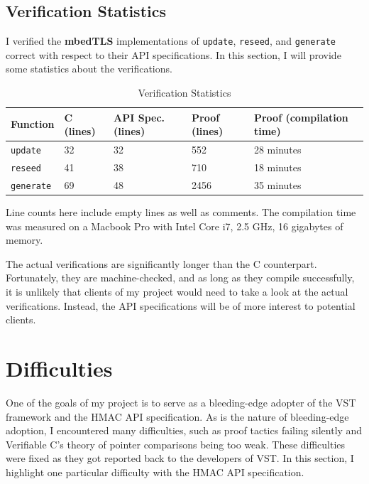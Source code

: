 \documentclass[pageno]{jpaper}
\newcommand{\stdtitle}[1]{\textbf{#1}}
\begin{document}
\subsection{Verification Statistics}

I verified the \stdtitle{mbedTLS} implementations of \lstinline{update}, \lstinline{reseed}, and \lstinline{generate} correct with respect to their API specifications. In this section, I will provide some statistics about the verifications.

\begin{table}[h!]
  \centering
  \begin{tabular}{|l|l|l|l|l|}
    \hline
    \textbf{Function} & \textbf{C (lines)} & \textbf{API Spec. (lines)} & \textbf{Proof (lines)} & \textbf{Proof (compilation time)}\\
    \hline
    \hline
    \lstinline{update} & 32 & 32 & 552 & 28 minutes \\
    \hline
    \lstinline{reseed} & 41 & 38 & 710 & 18 minutes \\
    \hline
    \lstinline{generate} & 69 & 48 & 2456 & 35 minutes \\
    \hline
  \end{tabular}
  \caption{Verification Statistics}
  \label{table:stats}
\end{table}

Line counts here include empty lines as well as comments. The compilation time was measured on a Macbook Pro with Intel Core i7, 2.5 GHz, 16 gigabytes of memory.

The actual verifications are significantly longer than the C counterpart. Fortunately, they are machine-checked, and as long as they compile successfully, it is unlikely that clients of my project would need to take a look at the actual verifications. Instead, the API specifications will be of more interest to potential clients.

\section{Difficulties}

One of the goals of my project is to serve as a bleeding-edge adopter of the VST framework and the HMAC API specification. As is the nature of bleeding-edge adoption, I encountered many difficulties, such as proof tactics failing silently and Verifiable C's theory of pointer comparisons being too weak. These difficulties were fixed as they got reported back to the developers of VST. In this section, I highlight one particular difficulty with the HMAC API specification.
\end{document}
